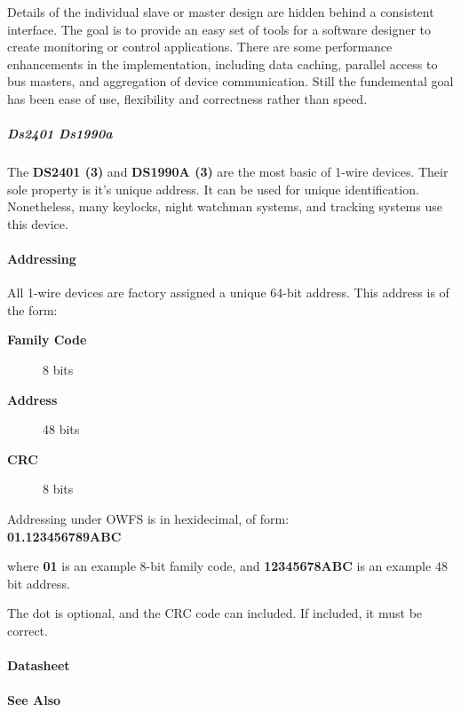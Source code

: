 Details of the individual
slave or master design are hidden behind a consistent interface. The goal
is to  provide an easy set of tools for a software designer to create monitoring
or control applications. There  are some performance enhancements in the
implementation, including data caching, parallel access to bus  masters,
and aggregation of device communication. Still the fundemental goal has
been ease of use, flexibility  and correctness rather than speed.  
\subparagraph*{Ds2401
Ds1990a}The \textsf{\textbf{DS2401 (3)}} and \textsf{\textbf{DS1990A (3)}} are the most basic of 1-wire devices.
Their sole property is it's unique address. It can be used for unique identification.
Nonetheless, many keylocks, night watchman systems, and tracking systems
use this device. 
\paragraph*{Addressing}
          All 1-wire devices are factory assigned
a unique 64-bit address. This address is of the form: \begin{description}
\item [\textbf{Family Code} ] 8 bits

\item [\textbf{Address} ] 48 bits 
\item [\textbf{CRC} ] 8 bits 
\end{description}


\begin{description}
\item [Addressing under OWFS is in hexidecimal, of
form: ] 
\item [\textbf{01.123456789ABC} ] 
\end{description}


where \textbf{01} is an example 8-bit family code, and \textbf{12345678ABC}
is an example 48 bit address. 

The dot is optional, and the CRC code can
included. If included, it must be correct.  
\paragraph*{Datasheet}



\paragraph*{See Also}

